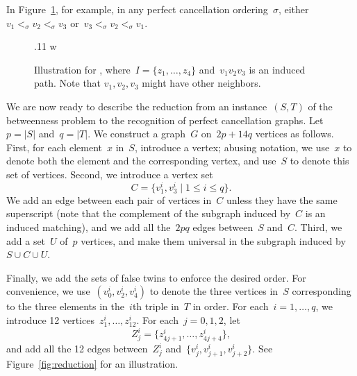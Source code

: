 \documentclass[a4paper,cleveref, autoref, 11pt, fleqn, thm-restate]{article}
\theoremstyle{plain}
\begin{document}
In Figure~\ref{fig:gadget}, for example, in any perfect cancellation ordering~$\sigma$, either~$v_1 <_\sigma v_2 <_\sigma v_3$ or~$v_3 <_\sigma v_2 <_\sigma v_1$.

\begin{figure}[ht]
  \centering \small
  .11 w
  \caption{Illustration for , where~$I = \{z_{1}, \ldots, z_{4}\}$ and~$v_{1} v_{2} v_{3}$ is an induced path.  Note that $v_{1}, v_{2}, v_{3}$ might have other neighbors.}
  \label{fig:gadget}
\end{figure}

We are now ready to describe the reduction from an instance~$(S, T)$ of the betweenness problem to the recognition of perfect cancellation graphs.
Let~$p = |S|$ and~$q = |T|$.
We construct a graph~$G$ on~$2 p + 14 q$ vertices as follows.
First, for each element~$x$ in~$S$, introduce a vertex; abusing notation, we use~$x$ to denote both the element and the corresponding vertex, and use~$S$ to denote this set of vertices.
Second, we introduce a vertex set
\[
  C = \{v_{1}^{i}, v_{3}^{i} \mid 1\le i \le q\}.
\]
We add an edge between each pair of vertices in~$C$ unless they have the same superscript (note that the complement of the subgraph induced by~$C$ is an induced matching), and we add all the~$2 p q$ edges between~$S$ and~$C$.
Third, we add a set~$U$ of~$p$ vertices, and make them universal in the subgraph induced by~$S\cup C\cup U$.

Finally, we add the sets of false twins to enforce the desired order.
For convenience, we use~$({v^{i}_{0}}, {v^{i}_{2}}, {v^{i}_{4}})$ to denote the three vertices in~$S$ corresponding to the three elements in the~$i$th triple in~$T$ in order.
For each~$i = 1, \ldots, q$, we introduce 12 vertices~$z_{1}^{i}, \ldots, z_{12}^{i}$.  For each~$j = 0, 1, 2$, let
\[
  Z^{i}_{j} = \{z_{4 j + 1}^{i}, \ldots, z_{4 j + 4}^{i}\},
\]
and add all the 12 edges between~$Z^{i}_{j}$ and~$\{v_{j}^{i}, v_{j+1}^{i}, v_{j+2}^{i}\}$.
See Figure~\ref{fig:reduction} for an illustration.
\end{document}
